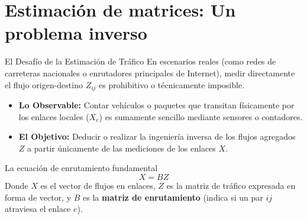 \documentclass[10pt]{beamer}
\begin{document}
    \section{Estimación de matrices: Un problema inverso}

    \begin{frame}{El Desafío de la Estimación de Tráfico}
        \justifying
        En escenarios reales (como redes de carreteras nacionales o enrutadores principales de Internet), medir directamente el flujo origen-destino $Z_{ij}$ es prohibitivo o técnicamente imposible.
        
        \begin{itemize}
            \item \textbf{Lo Observable:} Contar vehículos o paquetes que transitan físicamente por los enlaces locales ($X_e$) es sumamente sencillo mediante sensores o contadores.
            \item \textbf{El Objetivo:} Deducir o realizar la ingeniería inversa de los flujos agregados $Z$ a partir únicamente de las mediciones de los enlaces $X$.
        \end{itemize}

        \begin{exampleblock}{La ecuación de enrutamiento fundamental}
            \begin{equation}
                X = B Z
            \end{equation}
            Donde $X$ es el vector de flujos en enlaces, $Z$ es la matriz de tráfico expresada en forma de vector, y $B$ es la \textbf{matriz de enrutamiento} (indica si un par $ij$ atraviesa el enlace $e$).
        \end{exampleblock}
    \end{frame}
\end{document}
